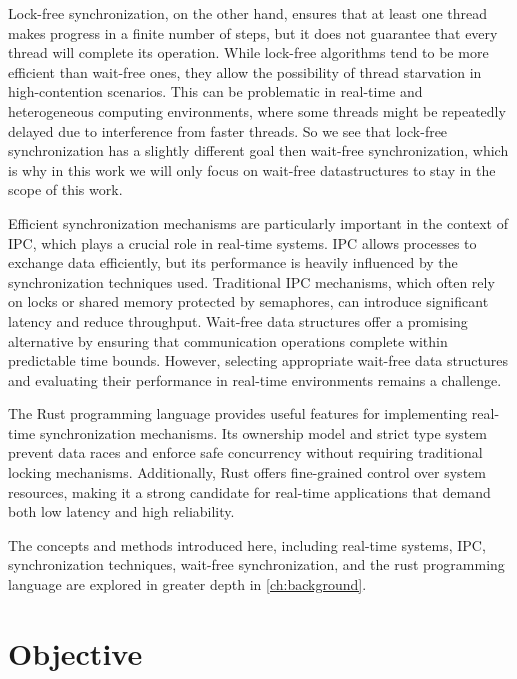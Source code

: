 Lock-free synchronization, on the other hand, ensures that at least one thread makes progress in a finite number of steps, but it does not guarantee that every thread will complete its operation. While lock-free algorithms tend to be more efficient than wait-free ones, they allow the possibility of thread starvation in high-contention scenarios. This can be problematic in real-time and heterogeneous computing environments, where some threads might be repeatedly delayed due to interference from faster threads. So we see that lock-free synchronization has a slightly different goal then wait-free synchronization, which is why in this work we will only focus on wait-free datastructures to stay in the scope of this work. \cite{kogan2012methodology}

Efficient synchronization mechanisms are particularly important in the context of \ac{IPC}, which plays a crucial role in real-time systems. \ac{IPC} allows processes to exchange data efficiently, but its performance is heavily influenced by the synchronization techniques used. Traditional \ac{IPC} mechanisms, which often rely on locks or shared memory protected by semaphores, can introduce significant latency and reduce throughput. Wait-free data structures offer a promising alternative by ensuring that communication operations complete within predictable time bounds. However, selecting appropriate wait-free data structures and evaluating their performance in real-time environments remains a challenge. \cite{timnat2014practical, michael1996simple, huang2002improvingWaitFree, pellegrini2020relevancewaitfreecoordinationalgorithms}

The Rust programming language provides useful features for implementing real-time synchronization mechanisms. Its ownership model and strict type system prevent data races and enforce safe concurrency without requiring traditional locking mechanisms. Additionally, Rust offers fine-grained control over system resources, making it a strong candidate for real-time applications that demand both low latency and high reliability. \cite{xu2023rust, sharma2024rustembeddedsystemscurrent}

The concepts and methods introduced here, including real-time systems, \ac{IPC}, synchronization techniques, wait-free synchronization, and the rust programming language are explored in greater depth in \cref{ch:background}. 

\section{Objective}\label{sec:objective}

